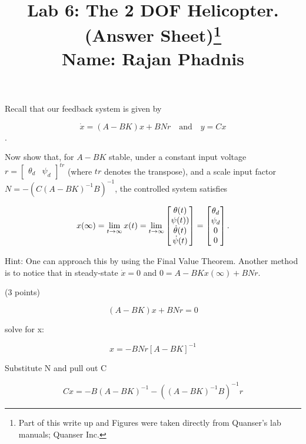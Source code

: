 \documentclass[11pt]{article}
\date{}
\author{}
\begin{document}
\title{ {\bf   Lab 6:  The 2 DOF Helicopter.  (Answer Sheet)\footnote{Part of this write up and Figures were
taken directly from Quanser's lab manuals; Quanser Inc.} \\



\vspace{1in}
Name: Rajan Phadnis  }}

\maketitle

\newpage

\vspace{1 cm}
\textcolor{blue}{}
\medskip

Recall that our feedback system is given by

\begin{equation*}
     \dot{x}=(A-BK)x+BNr\quad \mbox{and} \quad y=C x
\end{equation*}.

Now show that, for $A-BK$ stable, under a constant input voltage $r=\begin{bmatrix} \theta_d & \psi_d \end{bmatrix}^{tr}$ (where $tr$ denotes the transpose), and a scale input factor $N=-(C(A-BK)^{-1}B)^{-1}$, the controlled system satisfies 

\begin{equation*}
x(\infty)=\lim_{t\to\infty} x(t)= \lim_{t\to\infty}  \begin{bmatrix} \theta(t) \cr \psi(t)) \cr \dot{\theta}(t) \cr \dot{\psi}(t) \end{bmatrix}= \begin{bmatrix} \theta_d \cr \psi_d \cr 0 \cr 0 \end{bmatrix}.  
\end{equation*}

Hint: One can approach this by using the Final Value Theorem. Another method is to notice that in steady-state $\dot{x}=0$ and $0=A-BKx(\infty)+BNr$.

(3 points)

\[(A-BK)x+BNr=0\]

solve for x:

\[x=-BNr[A-BK]^{-1}\]

Substitute N and pull out C

\[Cx=-B(A-BK)^{-1}-((A-BK)^{-1}B)^{-1}r\]
\end{document}
